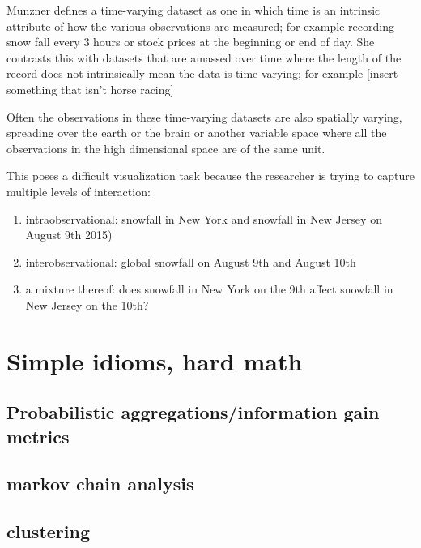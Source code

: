 \documentclass[letterpaper,onecolumn,titlepage]{Ythesis}
\begin{document}


Munzner \cite{Munzner14} defines a time-varying dataset as one in which time is an intrinsic attribute of how the various observations are measured; for example recording snow fall every 3 hours or stock prices at the beginning or end of day. She contrasts this with datasets that are amassed over time where the length of the record does not intrinsically mean the data is time varying; for example [insert something that isn't horse racing] 

Often the observations in these time-varying datasets are also spatially varying, spreading over the earth or the brain or another variable space where all the observations in the high dimensional space are of the same unit. %

This poses a difficult visualization task because the researcher is trying to capture multiple levels of interaction:
\begin{enumerate}
	\item intraobservational: snowfall in New York and snowfall in New Jersey on August 9th 2015)
	\item interobservational: global snowfall on August 9th and August 10th
	\item a mixture thereof: does snowfall in New York on the 9th affect snowfall in New Jersey on the 10th?
\end{enumerate}


\section{Simple idioms, hard math}

\subsection{Probabilistic aggregations/information gain metrics}
\label{sec:probabilistic}
\subsection{markov chain analysis}
\subsection{clustering}
\end{document}
